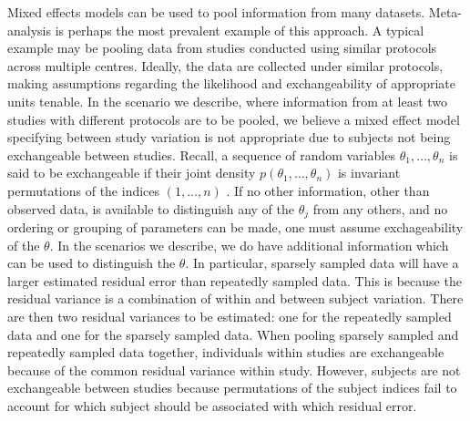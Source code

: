 Mixed effects models can be used to pool information from many datasets.  Meta-analysis is perhaps the most prevalent example of this approach.  A typical example may be pooling data from studies conducted using similar protocols across multiple centres.  Ideally, the data are collected under similar protocols, making assumptions regarding the likelihood and exchangeability of appropriate units tenable.  In the scenario we describe, where information from at least two studies with different protocols are to be pooled, we believe a mixed effect model specifying between study variation is not appropriate due to subjects not being exchangeable between studies.  Recall, a sequence of random variables $\theta_1, \dots, \theta_n$ is said to be exchangeable if their joint density $p(\theta_1, \dots, \theta_n)$ is invariant permutations of the indices $(1, \dots, n)$ \cite{gelman1995bayesian}.  If no other information, other than observed data, is available to distinguish any of the $\theta_j$ from any others, and no ordering or grouping of parameters can be made, one must assume exchageability of the $\theta$.  In the scenarios we describe, we do have additional information which can be used to distinguish the $\theta$.  In particular, sparsely sampled data will have a larger estimated residual error than repeatedly sampled data.  This is because the residual variance is a combination of within and between subject variation. There are then two residual variances to be estimated: one for the repeatedly sampled data and one for the sparsely sampled data.  When pooling sparsely sampled and repeatedly sampled data together, individuals within studies are exchangeable because of the common residual variance within study. However, subjects are not exchangeable between studies because permutations of the subject indices fail to account for which subject should be associated with which residual error.